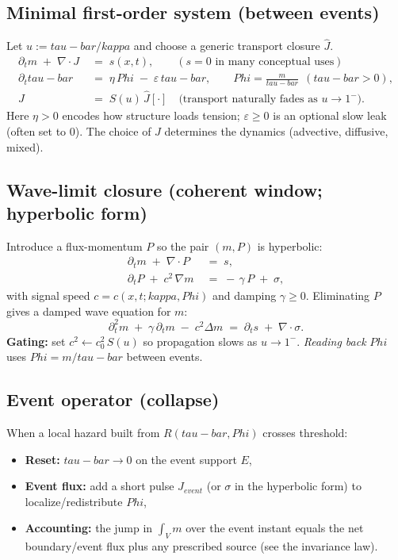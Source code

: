 \documentclass[12pt]{article}
\newcommand{\FoldDensity}{\Phi}
\newcommand{\FoldTime}{\bar{\tau}}
\newcommand{\Threshold}{\kappa}
\newcommand{\Survival}{S}
\newcommand{\Release}{R}
\def\FoldDensity{Phi}%
\def\FoldTime{tau-bar}%
\def\Threshold{kappa}%
\def\Survival{S}%
\def\Release{R}%
\def\bar#1{#1}%
\def\mathrm#1{#1}%
\begin{document}
\subsection{Minimal first-order system (between events)}
Let $u:=\FoldTime/\Threshold$ and choose a generic transport closure $\hat J$.
\begin{align*}
\partial_t m \;+\; \nabla\!\cdot J \;&=\; s(x,t), \qquad (s=0 \text{ in many conceptual uses}) \\
\partial_t \FoldTime \;&=\; \eta\,\FoldDensity \;-\; \varepsilon\,\FoldTime, \qquad \FoldDensity=\frac{m}{\FoldTime}\ \ (\FoldTime>0),\\
J \;&=\; \Survival(u)\,\hat J[\cdot] \quad \text{(transport naturally fades as $u\to 1^{-}$).}
\end{align*}
Here $\eta>0$ encodes how structure loads tension; $\varepsilon\ge 0$ is an optional slow leak (often set to $0$). The choice of $\hat J$ determines the dynamics (advective, diffusive, mixed).

\subsection[Wave-limit closure (coherent window)]{Wave-limit closure (coherent window; hyperbolic form)}
Introduce a flux-momentum $P$ so the pair $(m,P)$ is hyperbolic:
\begin{align*}
\partial_t m \;+\; \nabla\!\cdot P \;&=\; s,\\
\partial_t P \;+\; c^2\,\nabla m \;&=\; -\,\gamma\,P \;+\; \sigma,
\end{align*}
with signal speed $c=c(x,t;\Threshold,\FoldDensity)$ and damping $\gamma\ge 0$. Eliminating $P$ gives a damped wave equation for $m$:
\[
\partial_t^2 m \;+\; \gamma\,\partial_t m \;-\; c^2\Delta m \;=\; \partial_t s \;+\; \nabla\!\cdot \sigma.
\]
\textbf{Gating:} set $c^2 \gets c_0^2\,\Survival(u)$ so propagation slows as $u\to 1^{-}$. \emph{Reading back} $\FoldDensity$ uses $\FoldDensity=m/\FoldTime$ between events.

\subsection{Event operator (collapse)}
When a local hazard built from $\Release(\FoldTime,\FoldDensity)$ crosses threshold:
\begin{itemize}
  \item \textbf{Reset:} $\FoldTime \to 0$ on the event support $E$,
  \item \textbf{Event flux:} add a short pulse $J_{\mathrm{event}}$ (or $\sigma$ in the hyperbolic form) to localize/redistribute $\FoldDensity$,
  \item \textbf{Accounting:} the jump in $\int_V m$ over the event instant equals the net boundary/event flux plus any prescribed source (see the invariance law).
\end{itemize}
\end{document}
